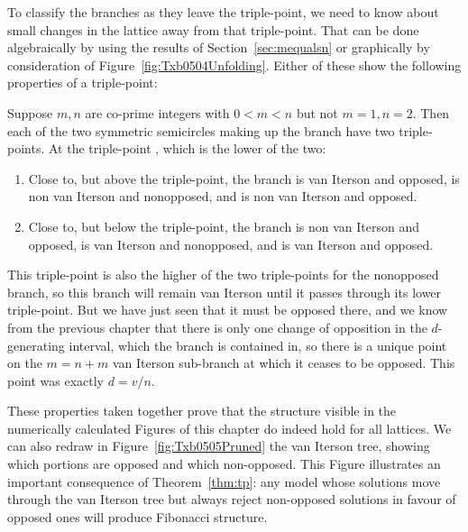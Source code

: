 %
%
To classify the branches as they leave the triple-point, we need to know about small changes in the lattice away from that triple-point. That can be done algebraically by using the results of Section~\ref{sec:mequalsn} or graphically by consideration of Figure~\ref{fig:Txb0504Unfolding}. Either of these show the following properties of a triple-point:
\begin{theorem}
	Suppose $m,n$ are co-prime integers with $0<m<n$ but not $m=1,n=2$. Then each of the two symmetric semicircles making up the branch  have two triple-points. At the triple-point , which is the lower of the two:
	\begin{enumerate}
		\item Close to, but above the triple-point, the branch   is van Iterson and opposed,  is non van Iterson  and nonopposed, and  is non van Iterson and opposed. 
		\item Close to, but below the triple-point, the branch  is non van Iterson and opposed,  is van Iterson and nonopposed, and  is van Iterson and opposed.
	\end{enumerate}
	\label{thm:tp}
\end{theorem}
This triple-point is also the higher of the two triple-points for the nonopposed branch, so this branch will remain van Iterson until it passes through its lower triple-point. But we have just seen that it must be opposed there, 
and we know from the previous chapter that there is only one change of opposition in the $d$-generating interval, which the branch is contained in, so there is a unique point on the $m=n+m$ van Iterson sub-branch at which it ceases to be opposed. This point was exactly $d=v/n$. 

These properties taken together prove that the structure visible in the numerically calculated Figures of this chapter do indeed hold for all lattices. We can also redraw in Figure~\ref{fig:Txb0505Pruned} the van Iterson tree, showing which portions are opposed and which non-opposed. This Figure illustrates an important consequence of Theorem~\ref{thm:tp}: any model whose solutions move through the van Iterson tree but always reject non-opposed solutions in favour of opposed ones will produce Fibonacci structure. 



